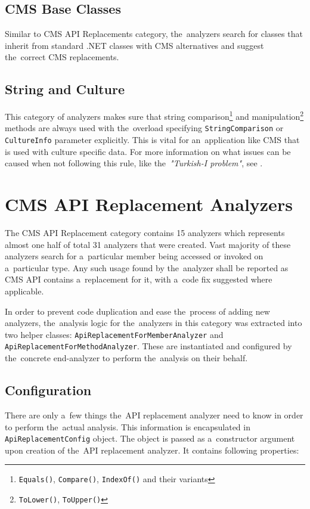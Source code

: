 \documentclass[
  digital, %
  table,   %
  lof,     %
  lot,     %
  oneside,
]{fithesis3}
\begin{document}
\subsection{CMS Base Classes}
Similar to CMS API Replacements category, the~analyzers search for classes that inherit from standard .NET classes with CMS alternatives and suggest the~correct CMS replacements.

\subsection{String and Culture}
This category of analyzers makes sure that string comparison\footnote{\texttt{Equals()}, \texttt{Compare()}, \texttt{IndexOf()} and their variants} and manipulation\footnote{\texttt{ToLower()}, \texttt{ToUpper()}} methods are always used with the~overload specifying \texttt{StringComparison} or \texttt{CultureInfo} parameter explicitly. This is vital for an~application like CMS that is used with culture specific data. For more information on what issues can be caused when not following this rule, like the~\textit{"Turkish-I problem"}, see \cite{best-practices-for-using-strings-in-dot-net}. 

\section{CMS API Replacement Analyzers}
The CMS API Replacement category contains 15 analyzers which represents almost one half of total 31 analyzers that were created. Vast majority of these analyzers search for a~particular member being accessed or invoked on a~particular type. Any such usage found by the~analyzer shall be reported as CMS API contains a~replacement for it, with a~code fix suggested where applicable.

In order to prevent code duplication and ease the~process of adding new analyzers, the~analysis logic for the~analyzers in this category was extracted into two helper classes: \texttt{ApiReplacementForMemberAnalyzer} and \texttt{ApiReplacementForMethodAnalyzer}. These are instantiated and configured by the~concrete end-analyzer to perform the~analysis on their behalf.

\subsection{Configuration}
There are only a~few things the~API replacement analyzer need to know in order to perform the~actual analysis. This information is encapsulated in \texttt{ApiReplacementConfig} object. The object is passed as a~constructor argument upon creation of the~API replacement analyzer. It contains following properties:
\end{document}
